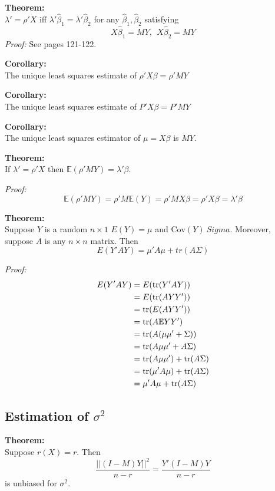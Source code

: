 \documentclass[12pt]{article}
\newcommand{\E}{\mathbb{E}}
\newcommand{\Cov}{\mathrm{Cov}}
\newcommand{\bhat}{\hat{\beta}}
\numberwithin{equation}{section}
\begin{document}
\textbf{Theorem:} \\
$\lambda' = \rho'X$ iff $\lambda' \bhat_1 = \lambda' \bhat_2$ for any $\bhat_1, \bhat_2$ satisfying
\begin{equation*}
  X\bhat_1 = MY, \ \ X\bhat_2 = MY
\end{equation*}
\textit{Proof:} See pages 121-122.

\textbf{Corollary:} \\
The unique least squares estimate of $\rho'X\beta = \rho' MY$

\textbf{Corollary:} \\
The unique least squares estimate of $P'X\beta = P'MY$

\textbf{Corollary:} \\
The unique least squares estimator of $\mu = X\beta$ is $MY$.

\textbf{Theorem:} \\
If $\lambda' = \rho'X$ then $\E(\rho'MY) = \lambda'\beta$.

\textit{Proof:}
\begin{equation*}
  \E(\rho'MY) = \rho' M \E(Y) = \rho' M X \beta = \rho' X \beta = \lambda' \beta
\end{equation*}

\textbf{Theorem:} \\
Suppose $Y$ is a random $n \times 1$ $E(Y) = \mu$ and $\Cov(Y) \ Sigma$. Moreover, suppose $A$ is any $n \times n$ matrix. Then
\begin{equation*}
  E(Y'AY) = \mu'A\mu + tr(A\Sigma)
\end{equation*}

\textit{Proof:} \\
\begin{align*}
  E(Y'AY) &= E(\tr(Y'AY))  \\
    &= E(\tr(AYY')) \\
    &= \tr(E(AYY')) \\
    &= \tr(A \E YY') \\
    &= \tr(A(\mu \mu' + \Sigma)) \\
    &= \tr(A\mu \mu' + A \Sigma) \\
    &= \tr(A \mu \mu') + \tr(A \Sigma) \\
    &= \tr(\mu' A \mu) + \tr(A \Sigma) \\
    &= \mu'A\mu + \tr(A \Sigma)
\end{align*}

\subsection{Estimation of $\sigma^2$}
\textbf{Theorem:} \\
Suppose $r(X) = r$. Then
\begin{equation*}
  \frac{||(I - M)Y||^2}{n - r} = \frac{Y'(I-M)Y}{n-r}
\end{equation*}
is unbiased for $\sigma^2$.
\end{document}
